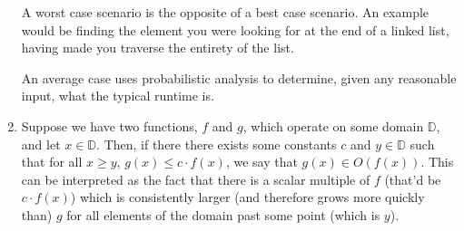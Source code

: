 \documentclass[10pt]{article}
\begin{document}
\begin{enumerate}[leftmargin=0em]
    A worst case scenario is the opposite of a best case scenario. An example would be finding the element you were looking for at the end of a linked list, having made you traverse the entirety of the list.

    An average case uses probabilistic analysis to determine, given any reasonable input, what the typical runtime is.
    \item Suppose we have two functions, $f$ and $g$, which operate on some domain $\mathbb{D}$, and let $x\in\mathbb{D}$. Then, if there there exists some constants $c$ and $y\in\mathbb{D}$ such that for all $x \geq y$, $g(x) \leq c\cdot f(x)$, we say that $g(x)\in O(f(x))$. This can be interpreted as the fact that there is a scalar multiple of $f$ (that'd be $c\cdot f(x)$) which is consistently larger (and therefore grows more quickly than) $g$ for all elements of the domain past some point (which is $y$).
\end{enumerate}
\end{document}
